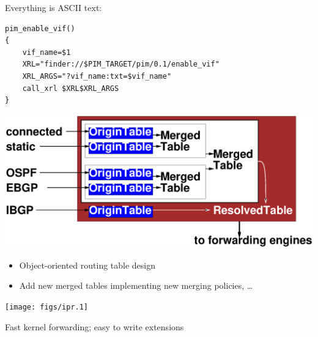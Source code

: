 \documentclass[landscape]{icsislides}
\begin{document}
\begin{slide}

Everything is ASCII text:

\begin{verbatim}
pim_enable_vif()
{
    vif_name=$1
    XRL="finder://$PIM_TARGET/pim/0.1/enable_vif"
    XRL_ARGS="?vif_name:txt=$vif_name"
    call_xrl $XRL$XRL_ARGS
}
\end{verbatim}

\end{slide}

\begin{slide}

\begin{center}
  \includegraphics[width=8.0in]{figs/routingtable}
\end{center}

\begin{itemize}
  \item Object-oriented routing table design
  \item Add new merged tables implementing new merging policies, \dots
\end{itemize}

\end{slide}

\begin{slide}

\begin{center}
  \texttt{[image: figs/ipr.1]}
\end{center}

Fast kernel forwarding; easy to write extensions

\end{slide}
\end{document}
